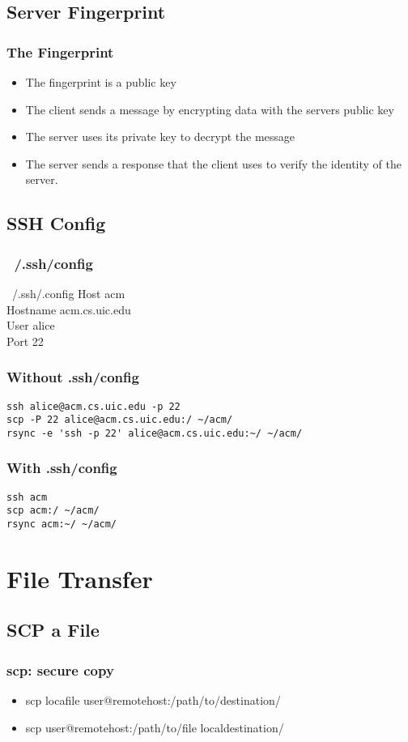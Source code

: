 \documentclass[hyperref={pdfpagelabels=false}]{beamer}
\begin{document}
\subsection{Server Fingerprint}
\frame
{
    \frametitle{The Fingerprint}
    \begin{itemize}
    \item{The fingerprint is a public key}
    \item{The client sends a message by encrypting data with the servers public key}
    \item{The server uses its private key to decrypt the message}
    \item{The server sends a response that the client uses to verify the identity of the server.}
    \end{itemize}
}
\subsection{SSH Config}
\frame
{
	\frametitle{~/.ssh/config}
	\begin{block}{~/.ssh/.config}
	Host acm\\
	Hostname acm.cs.uic.edu\\
	User alice\\
	Port 22
	\end{block}
}
\begin{frame}[fragile]
\frametitle{Without .ssh/config}
\begin{verbatim}
ssh alice@acm.cs.uic.edu -p 22
scp -P 22 alice@acm.cs.uic.edu:/ ~/acm/
rsync -e 'ssh -p 22' alice@acm.cs.uic.edu:~/ ~/acm/
\end{verbatim}
\end{frame}
\begin{frame}[fragile]
\frametitle{With .ssh/config}
\begin{verbatim}
ssh acm
scp acm:/ ~/acm/
rsync acm:~/ ~/acm/
\end{verbatim}
\end{frame}
\section{File Transfer}
\subsection{SCP a File}
\frame
{
    \frametitle{scp: secure copy}
    \begin{itemize}
    \item{scp locafile user@remotehost:/path/to/destination/}
    \item{scp user@remotehost:/path/to/file localdestination/}
    \end{itemize}
}
\end{document}
